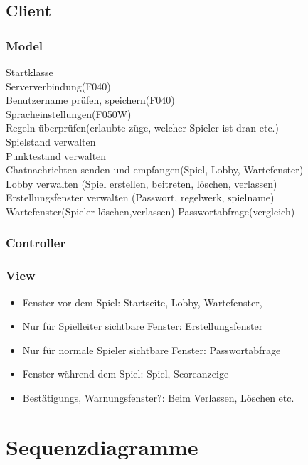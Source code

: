 \documentclass{article}
\begin{document}
	\subsection{Client}
	\subsubsection{Model}
		Startklasse \\
		Serververbindung(F040)\\
		Benutzername prüfen, speichern(F040)\\
		Spracheinstellungen(F050W) \\
		Regeln überprüfen(erlaubte züge, welcher Spieler ist dran etc.)\\
		Spielstand verwalten \\
		Punktestand verwalten\\
		Chatnachrichten senden und empfangen(Spiel, Lobby, Wartefenster) \\
		Lobby	verwalten (Spiel erstellen, beitreten, löschen, verlassen)\\	
		Erstellungsfenster verwalten (Passwort, regelwerk, spielname)\\
		Wartefenster(Spieler löschen,verlassen)
		Passwortabfrage(vergleich)\\
	\subsubsection{Controller}
	\subsubsection{View}
		\begin{itemize}
			\item{Fenster vor dem Spiel}: Startseite, Lobby, Wartefenster, 
			\item{Nur für Spielleiter sichtbare Fenster}: Erstellungsfenster
			\item{Nur für normale Spieler sichtbare Fenster}: Passwortabfrage
			\item{Fenster während dem Spiel}: Spiel, Scoreanzeige
			\item{Bestätigungs, Warnungsfenster?}: Beim Verlassen, Löschen etc.
		\end{itemize}


\section{Sequenzdiagramme}
\end{document}
